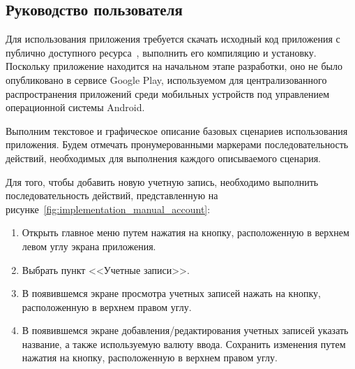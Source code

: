 \subsection{Руководство пользователя}

Для использования приложения требуется скачать исходный код
приложения с публично доступного ресурса~\cite{github_money_keeper},
выполнить его компиляцию и установку. Поскольку приложение
находится на начальном этапе разработки, оно не было опубликовано в
сервисе Google Play, используемом для централизованного распространения
приложений среди мобильных устройств под управлением операционной системы Android.

Выполним текстовое и графическое описание базовых сценариев использования приложения.
Будем отмечать пронумерованными маркерами последовательность действий,
необходимых для выполнения каждого описываемого сценария.

Для того, чтобы добавить новую учетную запись, необходимо выполнить
последовательность действий, представленную на
рисунке~\ref{fig:implementation_manual_account}:
\begin{enumerate}
  \item Открыть главное меню путем нажатия на кнопку,
    расположенную в верхнем левом углу экрана приложения.
  \item
    Выбрать пункт <<Учетные записи>>.
  \item В появившемся экране просмотра учетных записей
    нажать на кнопку, расположенную в верхнем правом углу.
  \item В появившемся экране добавления/редактирования
    учетных записей указать название, а также используемую валюту ввода.
    Сохранить изменения путем нажатия на кнопку, расположенную
    в верхнем правом углу.
\end{enumerate}

